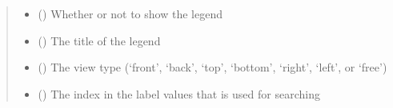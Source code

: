\documentclass[letterpaper,10pt,english]{sphinxmanual}
\begin{document}
\begin{fulllineitems}
\begin{quote}
\begin{description}
\begin{itemize}
\item {} 
 () \textendash{} Whether or not to show the legend

\item {} 
 () \textendash{} The title of the legend

\item {} 
 () \textendash{} The view type (‘front’, ‘back’, ‘top’, ‘bottom’, ‘right’, ‘left’, or ‘free’)

\item {} 
 () \textendash{} The index in the label values that is used for searching

\end{itemize}

\end{description}\end{quote}

\end{fulllineitems}




\renewcommand{\indexname}{Index}
\printindex
\end{document}
